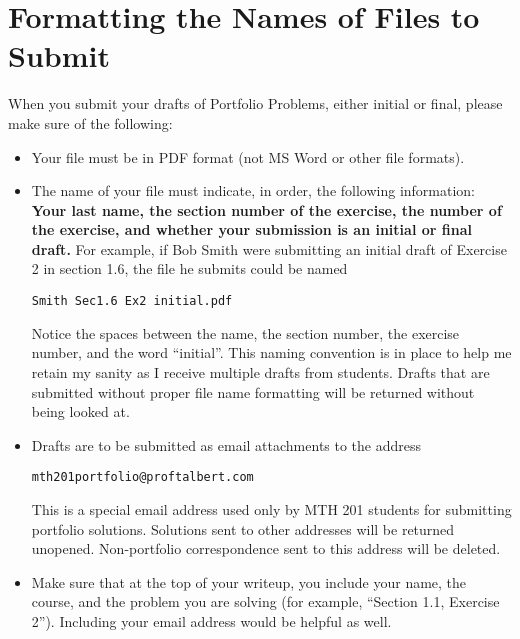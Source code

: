 \documentclass[11pt]{article}
\begin{document}
\begin{itemize}
	
	
\end{itemize}

		
\section*{Formatting the Names of Files to Submit}

When you submit your drafts of Portfolio Problems, either initial or final, please make sure of the following: 

\begin{itemize}
	\item Your file must be in PDF format (not MS Word or other file formats). 
	\item The name of your file must indicate, in order, the following information: \textbf{Your last name, the section number of the exercise, the number of the exercise, and whether your submission is an initial or final draft.} For example, if Bob Smith were submitting an initial draft of Exercise 2 in section 1.6, the file he submits could be named
\begin{center}
	\verb=Smith Sec1.6 Ex2 initial.pdf=
\end{center}
Notice the spaces between the name, the section number, the exercise number, and the word ``initial''. This naming convention is in place to help me retain my sanity as I receive multiple drafts from students. Drafts that are submitted without proper file name formatting will be returned without being looked at. 

	\item Drafts are to be submitted as email attachments to the address
	\begin{center}
		\verb=mth201portfolio@proftalbert.com=
	\end{center}
	This is a special email address used only by MTH 201 students for submitting portfolio solutions. Solutions sent to other addresses will be returned unopened. Non-portfolio correspondence sent to this address will be deleted. 
	
	\item Make sure that at the top of your writeup, you include your name, the course, and the problem you are solving (for example, ``Section 1.1, Exercise 2''). Including your email address would be helpful as well. 

\end{itemize}
\end{document}
